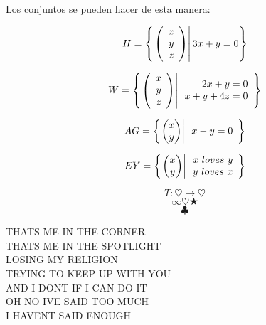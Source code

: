 \documentclass[10pt]{article}
\begin{document}
\problem{}

Los conjuntos se pueden hacer de esta manera:

$$H=\left\{ \left. \left( \begin{array}{r} x\\ y\\ z \end{array} \right) \right| 3x+y=0 \right\} $$

$$W=\left\{ \left. \left( \begin{array}{r} x\\ y\\ z \end{array} \right) \right| \begin{array}{r}
2x+y=0\\
x+y+4z=0\\
\end{array} \right\} $$

$$AG=\llaves{\vectrdos{x}{y}}{\begin{array}{r}
x-y=0\\


\end{array}}$$

$$EY=\left\{ \left. \begin{pmatrix} x\\ y\\ \end{pmatrix} \right| \begin{array}{r}
x\ loves\ y\\
y\ loves\ x\\
\end{array} \right\}$$

$$T : \heartsuit \rightarrow \heartsuit$$
$$\infty \heartsuit \bigstar $$
$$\clubsuit$$

THATS ME IN THE CORNER~\\
THATS ME IN THE SPOTLIGHT\\
LOSING MY RELIGION~\\
TRYING TO KEEP UP WITH YOU~\\
AND I DONT IF I CAN DO IT~\\
OH NO IVE SAID TOO MUCH~\\
I HAVENT SAID ENOUGH
\end{document}
